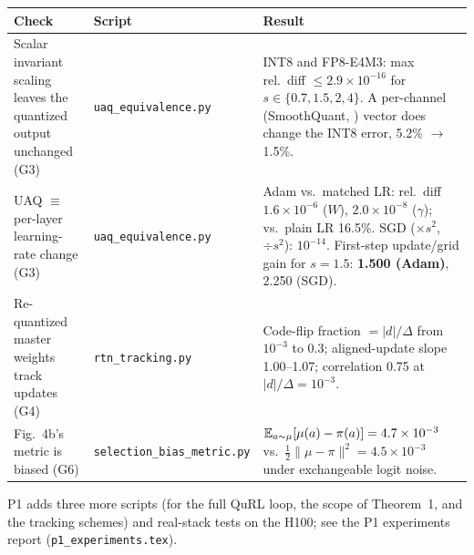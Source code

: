 \documentclass[11pt]{article}
\begin{document}
\begin{center}\small
\begin{tabularx}{\linewidth}{@{}L l L@{}}
\toprule
Check & Script & Result\\
\midrule
Scalar invariant scaling leaves the quantized output unchanged (G3) & \texttt{uaq\_equivalence.py} & INT8 and FP8-E4M3: max rel.\ diff $\le2.9\times10^{-16}$ for $s\in\{0.7,1.5,2,4\}$. A per-channel (SmoothQuant, \citealp{xiao2023smoothquant}) vector does change the INT8 error, 5.2\% $\to$ 1.5\%.\\
\addlinespace
UAQ $\equiv$ per-layer learning-rate change (G3) & \texttt{uaq\_equivalence.py} & Adam vs.\ matched LR: rel.\ diff $1.6\times10^{-6}$ ($W$), $2.0\times10^{-8}$ ($\gamma$); vs.\ plain LR 16.5\%. SGD ($\times s^2$, $\div s^2$): $10^{-14}$. First-step update/grid gain for $s=1.5$: \textbf{1.500 (Adam)}, 2.250 (SGD).\\
\addlinespace
Re-quantized master weights track updates (G4) & \texttt{rtn\_tracking.py} & Code-flip fraction $=|d|/\Delta$ from $10^{-3}$ to 0.3; aligned-update slope 1.00--1.07; correlation 0.75 at $|d|/\Delta=10^{-3}$.\\
\addlinespace
Fig.~4b's metric is biased (G6) & \texttt{selection\_bias\_metric.py} & $\mathbb{E}_{a\sim\mu}[\mu(a)-\pi(a)]=4.7\times10^{-3}$ vs.\ $\tfrac12\|\mu-\pi\|^2=4.5\times10^{-3}$ under exchangeable logit noise.\\
\bottomrule
\end{tabularx}
\end{center}

P1 adds three more scripts (for the full QuRL loop, the scope of Theorem~1, and the tracking schemes) and real-stack tests on the H100; see the P1 experiments report (\texttt{p1\_experiments.tex}).

\nocite{qi2025fp16,zhong2026diagnosing,zhu2025pathnottaken,krishnan2022quarl,gupta2015limited,li2017training,yang2022tp5}



\end{document}
